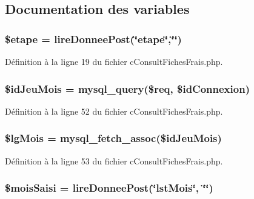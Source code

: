 \subsection{Documentation des variables}
\hypertarget{c_consult_fiches_frais_8php_a5c1bc42ba293d577d9e25d76e50f85ec}{
\subsubsection[{\$etape}]{\setlength{\rightskip}{0pt plus 5cm}\$etape = {\bf lire\-Donnee\-Post}(\char`\"{}etape\char`\"{},\char`\"{}\char`\"{})}}\label{c_consult_fiches_frais_8php_a5c1bc42ba293d577d9e25d76e50f85ec}


Définition à la ligne 19 du fichier c\-Consult\-Fiches\-Frais.\-php.

\hypertarget{c_consult_fiches_frais_8php_ae3f221921bd93ca690a99b756043483c}{
\subsubsection[{\$id\-Jeu\-Mois}]{\setlength{\rightskip}{0pt plus 5cm}\$id\-Jeu\-Mois = mysql\-\_\-query(\$req, \$id\-Connexion)}}\label{c_consult_fiches_frais_8php_ae3f221921bd93ca690a99b756043483c}


Définition à la ligne 52 du fichier c\-Consult\-Fiches\-Frais.\-php.

\hypertarget{c_consult_fiches_frais_8php_ad97348117c6ea6767b8494f27a153a0f}{
\subsubsection[{\$lg\-Mois}]{\setlength{\rightskip}{0pt plus 5cm}\$lg\-Mois = mysql\-\_\-fetch\-\_\-assoc(\$id\-Jeu\-Mois)}}\label{c_consult_fiches_frais_8php_ad97348117c6ea6767b8494f27a153a0f}


Définition à la ligne 53 du fichier c\-Consult\-Fiches\-Frais.\-php.

\hypertarget{c_consult_fiches_frais_8php_aca0267343316d569312879584a4db9dd}{
\subsubsection[{\$mois\-Saisi}]{\setlength{\rightskip}{0pt plus 5cm}\$mois\-Saisi = {\bf lire\-Donnee\-Post}(\char`\"{}lst\-Mois\char`\"{}, \char`\"{}\char`\"{})}}\label{c_consult_fiches_frais_8php_aca0267343316d569312879584a4db9dd}


